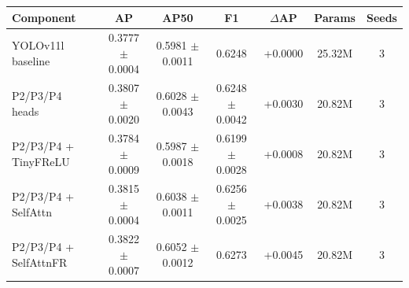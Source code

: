 \begin{tabular}{lcccccc}
\toprule
Component & AP & AP50 & F1 & $\Delta$AP & Params & Seeds \\
\midrule
YOLOv11l baseline & 0.3777 $\pm$ 0.0004 & 0.5981 $\pm$ 0.0011 & 0.6248 & +0.0000 & 25.32M & 3 \\
P2/P3/P4 heads & 0.3807 $\pm$ 0.0020 & 0.6028 $\pm$ 0.0043 & 0.6248 $\pm$ 0.0042 & +0.0030 & 20.82M & 3 \\
P2/P3/P4 + TinyFReLU & 0.3784 $\pm$ 0.0009 & 0.5987 $\pm$ 0.0018 & 0.6199 $\pm$ 0.0028 & +0.0008 & 20.82M & 3 \\
P2/P3/P4 + SelfAttn & 0.3815 $\pm$ 0.0004 & 0.6038 $\pm$ 0.0011 & 0.6256 $\pm$ 0.0025 & +0.0038 & 20.82M & 3 \\
P2/P3/P4 + SelfAttnFR & 0.3822 $\pm$ 0.0007 & 0.6052 $\pm$ 0.0012 & 0.6273 & +0.0045 & 20.82M & 3 \\
\bottomrule
\end{tabular}
